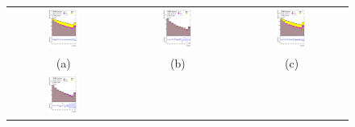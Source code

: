 \documentclass[PAPER, coverpage, atlasdraft=true, texlive=2016, UKenglish]{\ATLASLATEXPATH atlasdoc}
\begin{document}
\begin{figure}[H]
\centering
\begin{tabular}{@{}ccc@{}}
\includegraphics[page=1,width=0.29\textwidth]{figures/ttCR/tuH_reg1l1tau2b2j_os_log_ttCR.pdf} &
\includegraphics[page=1,width=0.29\textwidth]{figures/ttCR/tuH_reg1l1tau2b2j_ss_log_ttCR.pdf}&
\includegraphics[page=1,width=0.29\textwidth]{figures/ttCR/tuH_reg1l1tau2b3j_os_log_ttCR.pdf}\\
(a) & (b) & (c) \\
\includegraphics[page=1,width=0.29\textwidth]{figures/ttCR/tuH_reg1l1tau2b3j_ss_log_ttCR.pdf}&

\end{tabular}
\end{figure}
\end{document}
